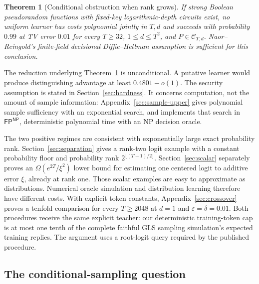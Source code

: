 \documentclass[11pt]{article}
\newtheorem{theorem}{Theorem}
\theoremstyle{definition}
\theoremstyle{remark}
\begin{document}
\begin{theorem}[Conditional obstruction when rank grows]\label{thm:hardness}
If strong Boolean pseudorandom functions with fixed-key logarithmic-depth circuits exist, no uniform learner has costs polynomial jointly in $T,d$ and succeeds with probability $0.99$ at TV error $0.01$ for every $T\ge32$, $1\le d\le T^2$, and $P\in\mathcal C_{T,d}$. Naor--Reingold's finite-field decisional Diffie--Hellman assumption is sufficient for this conclusion.
\end{theorem}

The reduction underlying Theorem~\ref{thm:hardness} is unconditional. A putative learner would produce distinguishing advantage at least $0.4801-o(1)$. The security assumption is stated in Section~\ref{sec:hardness}. It concerns computation, not the amount of sample information: Appendix~\ref{sec:sample-upper} gives polynomial sample sufficiency with an exponential search, and implements that search in $\mathsf{FP}^{\mathsf{NP}}$, deterministic polynomial time with an NP decision oracle.

The two positive regimes are consistent with exponentially large exact probability rank. Section~\ref{sec:separation} gives a rank-two logit example with a constant probability floor and probability rank $2^{\lfloor(T-1)/2\rfloor}$. Section~\ref{sec:scalar} separately proves an $\Omega(e^{2T}/\xi^2)$ lower bound for estimating one centered logit to additive error $\xi$, already at rank one. Those scalar examples are easy to approximate as distributions. Numerical oracle simulation and distribution learning therefore have different costs. With explicit token constants, Appendix~\ref{sec:crossover} proves a tenfold comparison for every $T\ge2048$ at $d=1$ and $\varepsilon=\delta=0.01$. Both procedures receive the same explicit teacher: our deterministic training-token cap is at most one tenth of the complete faithful GLS sampling simulation's expected training replies. The argument uses a root-logit query required by the published procedure.

\newpage
\subsection{The conditional-sampling question}
\end{document}
